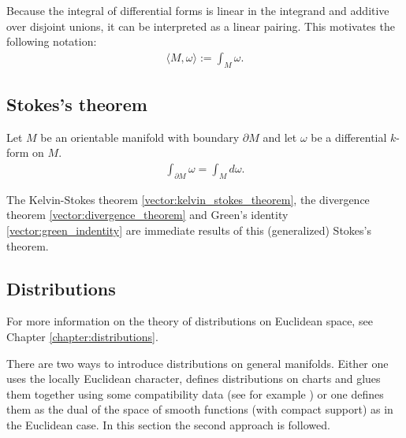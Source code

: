 
    \begin{notation}
        Because the integral of differential forms is linear in the integrand and additive over disjoint unions, it can be interpreted as a linear pairing. This motivates the following notation:
        \begin{gather}
            \langle M,\omega \rangle := \int_M\omega.
        \end{gather}
    \end{notation}

\subsection{Stokes's theorem}

    \begin{theorem}\label{bundle:stokes_theorem}
        Let $M$ be an orientable manifold with boundary $\partial M$ and let $\omega$ be a differential $k$-form on $M$.
        \begin{gather}
            \int_{\partial M}\omega = \int_M d\omega.
        \end{gather}
    \end{theorem}
    \begin{result}
        The Kelvin-Stokes theorem \ref{vector:kelvin_stokes_theorem}, the divergence theorem \ref{vector:divergence_theorem} and Green's identity \ref{vector:green_indentity} are immediate results of this (generalized) Stokes's theorem.
    \end{result}

\subsection{Distributions}

    For more information on the theory of distributions on Euclidean space, see Chapter \ref{chapter:distributions}.

    There are two ways to introduce distributions on general manifolds. Either one uses the locally Euclidean character, defines distributions on charts and glues them together using some compatibility data (see for example \cite{AMP1}) or one defines them as the dual of the space of smooth functions (with compact support) as in the Euclidean case. In this section the second approach is followed.

